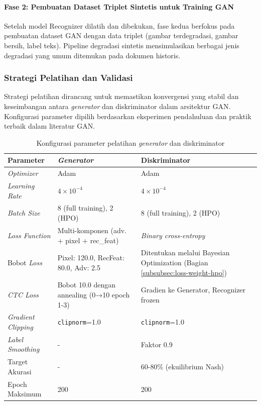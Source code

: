 \documentclass[12pt,a4paper]{article}
\begin{document}
\paragraph{Fase 2: Pembuatan Dataset Triplet Sintetis untuk Training GAN}
Setelah model Recognizer dilatih dan dibekukan, fase kedua berfokus pada pembuatan dataset GAN dengan data triplet (gambar terdegradasi, gambar bersih, label teks). Pipeline degradasi sintetis mensimulasikan berbagai jenis degradasi yang umum ditemukan pada dokumen historis.

\subsubsection{Strategi Pelatihan dan Validasi}
Strategi pelatihan dirancang untuk memastikan konvergensi yang stabil dan keseimbangan antara \textit{generator} dan diskriminator dalam arsitektur GAN. Konfigurasi parameter dipilih berdasarkan eksperimen pendahuluan dan praktik terbaik dalam literatur GAN.

\begin{table}[H]
\centering
\caption{Konfigurasi parameter pelatihan \textit{generator} dan diskriminator}
\label{tab:training-config}
\small
\begin{tabular}{|l|l|l|}
\hline
\textbf{Parameter} & \textbf{\textit{Generator}} & \textbf{Diskriminator} \\ \hline
\textit{Optimizer} & Adam & Adam \\ \hline
\textit{Learning Rate} & $4 \times 10^{-4}$ & $4 \times 10^{-4}$ \\ \hline
\textit{Batch Size} & 8 (full training), 2 (HPO) & 8 (full training), 2 (HPO) \\ \hline
\textit{Loss Function} & Multi-komponen (adv. + pixel + rec\_feat) & \textit{Binary cross-entropy} \\ \hline
Bobot \textit{Loss} & Pixel: 120.0, RecFeat: 80.0, Adv: 2.5 & Ditentukan melalui Bayesian Optimization (Bagian \ref{subsubsec:loss-weight-hpo}) \\ \hline
\textit{CTC Loss} & Bobot 10.0 dengan annealing (0→10 epoch 1-3) & Gradien ke Generator, Recognizer frozen \\ \hline
\textit{Gradient Clipping} & \texttt{clipnorm}=1.0 & \texttt{clipnorm}=1.0 \\ \hline
\textit{Label Smoothing} & - & Faktor 0.9 \\ \hline
Target Akurasi & - & 60-80\% (ekuilibrium Nash) \\ \hline
Epoch Maksimum & 200 & 200 \\ \hline
\end{tabular}
\end{table}
\end{document}
